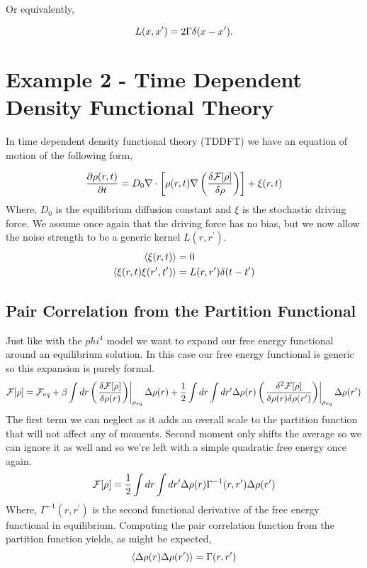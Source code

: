 Or equivalently,

\begin{equation} L(x, x^\prime) = 2\Gamma \delta(x - x^\prime).  \end{equation}

\section{Example 2 - Time Dependent Density Functional Theory}

In time dependent density functional theory (TDDFT) we have an equation of
motion of the following form,

\begin{equation} \frac{\partial \rho(r, t)}{\partial t} = D_0 \nabla \cdot
\left[\rho(r,t)\nabla \left(\frac{\delta \mathcal{F}[\rho]}{\delta \rho}\right)\right] + \xi(r, t) \end{equation}
%
Where, $D_0$ is the equilibrium diffusion constant and $\xi$ is the stochastic
driving force. We assume once again that the driving force has no bias, but we
now allow the noise strength to be a generic kernel $L(r, r^\prime)$.
%
\begin{align} \langle \xi(r,t) \rangle &= 0 \\ \left\langle \xi(r, t)
\xi(r^\prime, t^\prime) \right\rangle &= L(r, r^\prime) \delta (t -t^\prime)
\end{align}
%
\subsection{Pair Correlation from the Partition Functional} %

Just like with the $phi^4$ model we want to expand our free energy functional
around an equilibrium solution. In this case our free energy functional is
generic so this expansion is purely formal.
%
\begin{equation} \mathcal{F}[\rho] = \mathcal{F}_{eq} + \beta\int dr \left(\left.\frac{\delta \mathcal{F}[\rho]}{\delta
\rho(r)}\right)\right\vert_{\rho_{eq}}\Delta\rho(r) + \frac{1}{2} \int dr \int dr^\prime
\Delta\rho(r) \left(\left.\frac{\delta^2 \mathcal{F}[\rho]}{\delta \rho(r) \delta
\rho(r^\prime)}\right)\right\vert_{\rho_{eq}} \Delta\rho(r^\prime) \end{equation}
%
The first term we can neglect as it adds an overall scale to the partition
function that will not affect any of moments. Second moment only shifts the
average so we can ignore it as well and so we're left with a simple quadratic
free energy once again.
%
\begin{equation} \mathcal{F}[\rho] = \frac{1}{2}\int dr \int dr^\prime \Delta \rho(r)
\Gamma^{-1}(r, r^\prime) \Delta \rho(r^\prime) \end{equation}
%
Where, $\Gamma^{-1}(r, r^\prime)$ is the second functional derivative of the
free energy functional in equilibrium. Computing the pair correlation function
from the partition function yields, as might be expected,
%
\begin{equation} \left\langle \Delta\rho(r) \Delta\rho(r^\prime) \right\rangle =
\Gamma(r, r^\prime) \end{equation}
%
